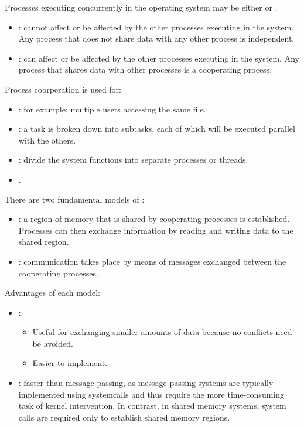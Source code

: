  \par Processes executing concurrently in the operating system may be either
 or .
  \begin{itemize}
    \item {}: cannot affect or be affected by the other processes executing in the system. Any process that does not share data with any other process is independent.
    \item {}: can affect or be affected by the other processes executing in the system. Any process that shares data with other processes is a cooperating process.
  \end{itemize}
  \par Process coorperation is used for:
    \begin{itemize}
      \item {}: for example: multiple users accessing the same file.
      \item {}: a task is broken down into subtasks, each of which will be executed parallel with the others.
      \item {}: divide the system functions into separate processes or threads.
      \item {}.
    \end{itemize}
  \par There are two fundamental models of :
  \begin{itemize}
    \item {}:  a region of memory that is shared by cooperating processes is established. Processes can then exchange information by reading and writing data to the shared region.
    \item {}: communication takes place by means of messages exchanged between the cooperating processes.
  \end{itemize}
  \par Advantages of each model:
  \begin{itemize}
    \item {}:
      \begin{itemize}
        \item Useful for exchanging smaller amounts of data because no conflicts need be avoided.
        \item Easier to implement.
      \end{itemize}
    \item {}: faster than message passing, as message passing systems are typically implemented using systemcalls and thus require the more time-consuming task of kernel intervention. In contrast, in shared memory systems, system calls are required only to establish shared memory regions.
  \end{itemize}

